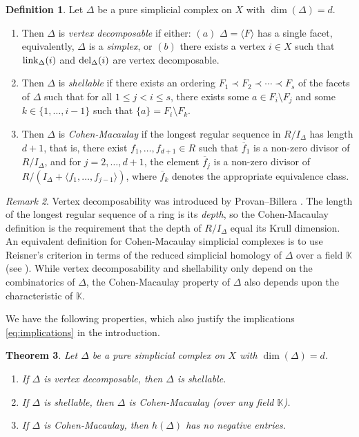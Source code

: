 \documentclass[12pt]{amsart}
\theoremstyle{plain}
\newtheorem{theorem}{Theorem}[section]
\theoremstyle{definition}
\newtheorem{definition}[theorem]{Definition}
\theoremstyle{remark}
\newtheorem{remark}[theorem]{Remark}
\numberwithin{equation}{section}
\numberwithin{equation}{section}
\begin{document}
\begin{definition}  
Let $\Delta$ be a pure simplicial complex on $X$ with
$\dim(\Delta) = d$.
\begin{enumerate}
    \item Then $\Delta$ is {\it vertex decomposable} if either: $(a)$
    $\Delta = \langle F \rangle$ has a single facet, equivalently,
    $\Delta$ is a {\it simplex}, or $(b)$ there exists a vertex $i \in X$
    such that ${\rm link}_\Delta(i)$ and ${\rm del}_\Delta(i)$ are vertex
    decomposable.
    \item Then $\Delta$ is {\it shellable} if there exists an ordering
    $F_1 \prec F_2 \prec \cdots \prec F_s$ of the facets of $\Delta$
    such that for all $1 \leq j < i \leq s$, there exists some $a \in F_i \setminus F_j$ and some $k \in \{1,\ldots,i-1\}$ such that 
    $\{a\} = F_i\setminus F_k$.
    \item Then $\Delta$ is {\it Cohen-Macaulay} if the longest 
    regular sequence in $R/I_\Delta$ has length $d+1$, that is, there
    exist $f_1,\ldots,f_{d+1} \in R$ such that $\overline{f}_1$ is a 
    non-zero divisor
    of $R/I_\Delta$, and for $j=2,\ldots,d+1$, the element 
    $\overline{f}_j$ is a 
    non-zero divisor of $R/(I_\Delta + \langle f_1,\ldots,f_{j-1} \rangle)$,
    where $\overline{f}_k$ denotes the appropriate equivalence class.
\end{enumerate}
\end{definition}

\begin{remark}
    Vertex decomposability was introduced by Provan--Billera \cite{PB1980}.
       The length of the longest regular sequence of a ring is its {\it depth},
    so the Cohen-Macaulay definition is the requirement that
    the depth of $R/I_\Delta$ equal its Krull dimension. 
    An equivalent definition for Cohen-Macaulay simplicial complexes is
    to use Reisner's criterion in terms of the reduced simplicial homology of
    $\Delta$ over a field $\mathbb{K}$ (see \cite[Theorem 5.3.5]{VBook}).  While
    vertex decomposability and shellability only depend on the combinatorics
    of $\Delta$, the Cohen-Macaulay property of $\Delta$ also depends upon
    the characteristic of $\mathbb{K}$.
\end{remark}

We have the following properties, which also justify the implications \eqref{eq:implications} in the introduction.

\begin{theorem}\label{thm:mainproperties}
Let $\Delta$ be a pure simplicial complex on $X$ with 
$\dim(\Delta) =d$.
\begin{enumerate}
    \item \cite[Corollary 2.9]{PB1980} If $\Delta$ is vertex decomposable, then $\Delta$ is shellable.
    \item \cite[Theorem 5.3.18]{VBook} If $\Delta$ is shellable, then $\Delta$ is Cohen-Macaulay (over
    any field $\mathbb{K}$).
    \item  \cite[Theorem 5.4.8]{VBook}
    If $\Delta$ is Cohen-Macaulay, then $h(\Delta)$
    has no negative entries.
\end{enumerate}
\end{theorem}
\end{document}
